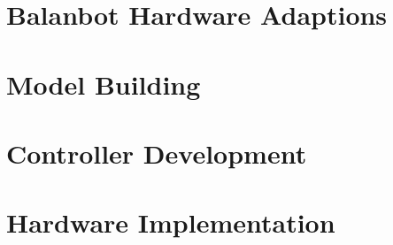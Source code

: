 \newcommand{\german}{false} %
\newcommand{\coloredTitlePage}{true} %
\newcommand{\company}{false}
\newcommand{\ECE}{true}
\newcommand{\RN}[1]{\uppercase\expandafter{\romannumeral#1}}

\usepackage{hyperref}

\makeglossaries

\makeatletter
\newcommand{\myscope}[2] %
{\draw[thick,rotate=#2] (#1) circle (12pt)
 (#1) ++(-0.35,-0.1) -- ++(0.3,0.3) --++(0,-0.3)-- ++(0.3,0.3) --++(0,-0.3);
}
\newcommand{\costumPicWidth}[0]{
0.8\textwidth
}

\newcommand{\costumPlotWidth}[0]{
\textwidth
}






\frontmatter
\renewcommand{\thepage}{\Roman{page}}



\tableofcontents
\printglossary
\mainmatter
\chapter{Balanbot Hardware Adaptions}


\chapter{Model Building}


\chapter{Controller Development}


\chapter{Hardware Implementation}


